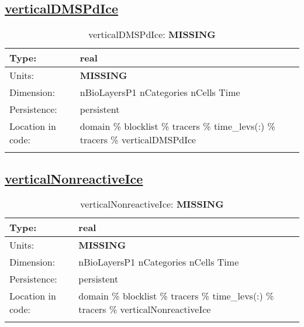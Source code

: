 \subsection[verticalDMSPdIce]{\hyperref[sec:var_tab_tracers]{verticalDMSPdIce}}
\label{subsec:var_sec_tracers_verticalDMSPdIce}
\begin{center}
\begin{longtable}{| p{2.0in} | p{4.0in} |}
        \hline 
        Type: & real \\
        \hline 
        Units: & {\bf \color{red} MISSING} \\
        \hline 
        Dimension: & nBioLayersP1 nCategories nCells Time \\
        \hline 
        Persistence: & persistent \\
        \hline 
         Location in code: & domain \% blocklist \% tracers \% time\_levs(:) \% tracers \% verticalDMSPdIce \\
         \hline 
    \caption{verticalDMSPdIce: {\bf \color{red} MISSING}}
\end{longtable}
\end{center}
\subsection[verticalNonreactiveIce]{\hyperref[sec:var_tab_tracers]{verticalNonreactiveIce}}
\label{subsec:var_sec_tracers_verticalNonreactiveIce}
\begin{center}
\begin{longtable}{| p{2.0in} | p{4.0in} |}
        \hline 
        Type: & real \\
        \hline 
        Units: & {\bf \color{red} MISSING} \\
        \hline 
        Dimension: & nBioLayersP1 nCategories nCells Time \\
        \hline 
        Persistence: & persistent \\
        \hline 
         Location in code: & domain \% blocklist \% tracers \% time\_levs(:) \% tracers \% verticalNonreactiveIce \\
         \hline 
    \caption{verticalNonreactiveIce: {\bf \color{red} MISSING}}
\end{longtable}
\end{center}
